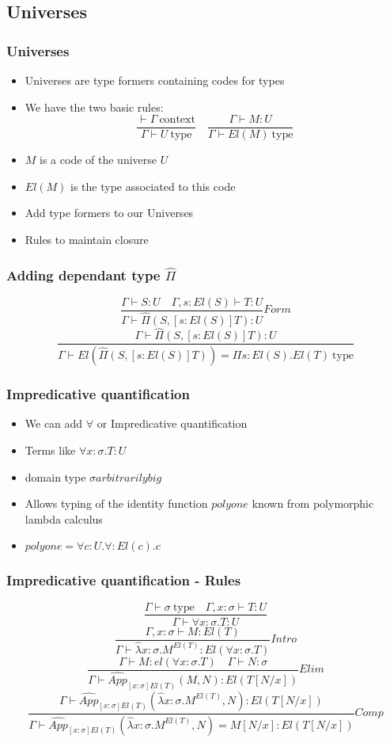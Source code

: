\documentclass[aspectratio=169]{beamer}
\newcommand{\cntxt}{\ \mathrm{context}}
\newcommand{\typ}{\ \mathrm{type}}
\newcommand{\C}{Comp}
\newcommand{\Intro}{Intro}
\newcommand{\F}{Form}
\newcommand{\E}{Elim}
\newcommand{\Pich}{\hat{\Pi}}
\newcommand{\Appch}[2]{\hat{App}_{[x:\sigma]El(T)}(#1,#2)}
\newcommand{\lambdach}{\hat{\lambda} x:\sigma.M^{El(T)}}
\newcommand{\Gamdash}{\Gamma\vdash}
\begin{document}
    \subsection{Universes}
    \begin{frame}
        \frametitle{Universes}
        \begin{itemize}
            \item Universes are type formers containing codes for types
            \item We have the two basic rules:
            $$\frac{\vdash \Gamma \cntxt}{\Gamma \vdash U \typ}\quad\frac{\Gamma \vdash M:U}{\Gamdash El(M)\typ}$$
            \item $M$ is a code of the universe $U$
            \item $El(M)$ is the type associated to this code
            \item Add type formers to our Universes
            \item Rules to maintain closure
        \end{itemize}
          
    \end{frame}
    \begin{frame}
        \frametitle{Adding dependant type $\Pich$}
        $$\frac{\Gamma \vdash S:U\quad \Gamma,s:El(S)\vdash T:U}{\Gamma \vdash \Pich(S,[s:El(S)]T):U}\F$$
        \vspace{15pt}
        $$\frac{\Gamdash\Pich(S,[s:El(S)]T):U}{\Gamdash El(\Pich(S,[s:El(S)]T)) = \Pi s:El(S).El(T) \typ}$$
    \end{frame}
    \begin{frame}
        \frametitle{Impredicative quantification}
        \begin{itemize}
            \item We can add $\forall$ or Impredicative quantification
            \item Terms like $\forall x:\sigma.T:U$
            \item domain type $\sigma arbitrarily big$
            \item Allows typing of the identity function $polyone$ known from polymorphic lambda calculus
            \item $polyone = \forall c:U.\forall:El(c).c$
        \end{itemize}
    \end{frame}
    \begin{frame}
        \frametitle{Impredicative quantification - Rules}
        $$\frac{\Gamdash\sigma\typ\quad\Gamma,x:\sigma\vdash T:U}{\Gamdash\forall x:\sigma.T:U}$$
        $$\frac{\Gamma,x:\sigma\vdash M:El(T)}{\Gamdash\lambdach:El(\forall x:\sigma.T)}\Intro$$
        $$\frac{\Gamdash M:el(\forall x:\sigma.T)\quad\Gamdash N:\sigma}{\Gamdash\Appch{M}{N}:El(T[N/x])}\E$$
        $$\frac{\Gamdash\Appch{\lambdach}{N}:El(T[N/x])}{\Gamdash\Appch{\lambdach}{N}=M[N/x]:El(T[N/x])}\C$$
    \end{frame}
\end{document}
